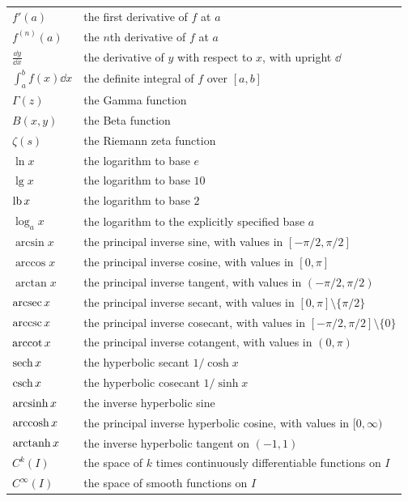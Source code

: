 {\begin{longtable}{@{}L{0.27\textwidth}L{0.65\textwidth}@{}}
        $f'(a)$ & the first derivative of $f$ at $a$ \\
        $f^{(n)}(a)$ & the $n$th derivative of $f$ at $a$ \\
        $\displaystyle\frac{\dd y}{\dd x}$ & the derivative of $y$ with respect to $x$, with upright $\dd$ \\
        $\displaystyle\int_a^b f(x)\dd x$ & the definite integral of $f$ over $[a,b]$ \\
        $\Gamma(z)$ & the Gamma function \\
        $B(x,y)$ & the Beta function \\
        $\zeta(s)$ & the Riemann zeta function \\
        $\ln x$ & the logarithm to base $e$ \\
        $\lg x$ & the logarithm to base $10$ \\
        $\operatorname{lb} x$ & the logarithm to base $2$ \\
        $\log_a x$ & the logarithm to the explicitly specified base $a$ \\
        $\arcsin x$ & the principal inverse sine, with values in $[-\pi/2,\pi/2]$ \\
        $\arccos x$ & the principal inverse cosine, with values in $[0,\pi]$ \\
        $\arctan x$ & the principal inverse tangent, with values in $(-\pi/2,\pi/2)$ \\
        $\operatorname{arcsec} x$ & the principal inverse secant, with values in $[0,\pi]\setminus\{\pi/2\}$ \\
        $\operatorname{arccsc} x$ & the principal inverse cosecant, with values in $[-\pi/2,\pi/2]\setminus\{0\}$ \\
        $\operatorname{arccot} x$ & the principal inverse cotangent, with values in $(0,\pi)$ \\
        $\operatorname{sech} x$ & the hyperbolic secant $1/\cosh x$ \\
        $\operatorname{csch} x$ & the hyperbolic cosecant $1/\sinh x$ \\
        $\operatorname{arcsinh} x$ & the inverse hyperbolic sine \\
        $\operatorname{arccosh} x$ & the principal inverse hyperbolic cosine, with values in $[0,\infty)$ \\
        $\operatorname{arctanh} x$ & the inverse hyperbolic tangent on $(-1,1)$ \\
        $C^k(I)$ & the space of $k$ times continuously differentiable functions on $I$ \\
        $C^\infty(I)$ & the space of smooth functions on $I$ \\

\end{longtable}}
